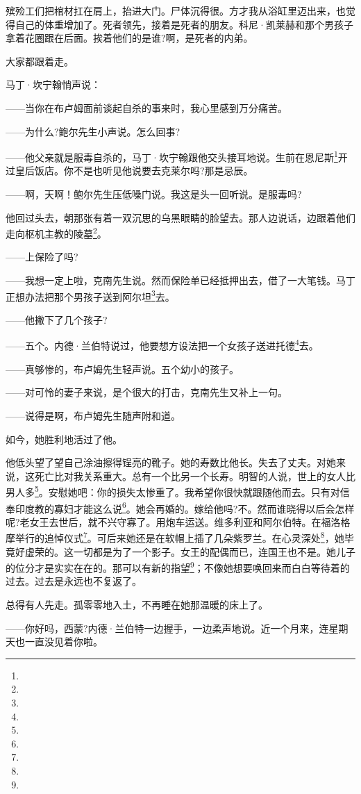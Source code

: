 \par 殡殓工们把棺材扛在肩上，抬进大门。尸体沉得很。方才我从浴缸里迈出来，也觉得自己的体重增加了。死者领先，接着是死者的朋友。科尼·凯莱赫和那个男孩子拿着花圈跟在后面。挨着他们的是谁?啊，是死者的内弟。
\par 大家都跟着走。
\par 马丁·坎宁翰悄声说：
\par ——当你在布卢姆面前谈起自杀的事来时，我心里感到万分痛苦。
\par ——为什么?鲍尔先生小声说。怎么回事?
\par ——他父亲就是服毒自杀的，马丁·坎宁翰跟他交头接耳地说。生前在恩尼斯\footnote{}开过皇后饭店。你不是也听见他说要去克莱尔吗?那是忌辰。
\par ——啊，天啊！鲍尔先生压低嗓门说。我这是头一回听说。是服毒吗?
\par 他回过头去，朝那张有着一双沉思的乌黑眼睛的脸望去。那人边说话，边跟着他们走向枢机主教的陵墓\footnote{}。
\par ——上保险了吗?
\par ——我想一定上啦，克南先生说。然而保险单已经抵押出去，借了一大笔钱。马丁正想办法把那个男孩子送到阿尔坦\footnote{}去。
\par ——他撇下了几个孩子?
\par ——五个。内德·兰伯特说过，他要想方设法把一个女孩子送进托德\footnote{}去。
\par ——真够惨的，布卢姆先生轻声说。五个幼小的孩子。
\par ——对可怜的妻子来说，是个很大的打击，克南先生又补上一句。
\par ——说得是啊，布卢姆先生随声附和道。
\par 如今，她胜利地活过了他。
\par 他低头望了望自己涂油擦得锃亮的靴子。她的寿数比他长。失去了丈夫。对她来说，这死亡比对我关系重大。总有一个比另一个长寿。明智的人说，世上的女人比男人多\footnote{}。安慰她吧：你的损失太惨重了。我希望你很快就跟随他而去。只有对信奉印度教的寡妇才能这么说\footnote{}。她会再婚的。嫁给他吗?不。然而谁晓得以后会怎样呢?老女王去世后，就不兴守寡了。用炮车运送。维多利亚和阿尔伯特。在福洛格摩举行的追悼仪式\footnote{}。可后来她还是在软帽上插了几朵紫罗兰。在心灵深处\footnote{}，她毕竟好虚荣的。这一切都是为了一个影子。女王的配偶而已，连国王也不是。她儿子的位分才是实实在在的。那可以有新的指望\footnote{}；不像她想要唤回来而白白等待着的过去。过去是永远也不复返了。
\par 总得有人先走。孤零零地入土，不再睡在她那温暖的床上了。
\par ——你好吗，西蒙?内德·兰伯特一边握手，一边柔声地说。近一个月来，连星期天也一直没见着你啦。
